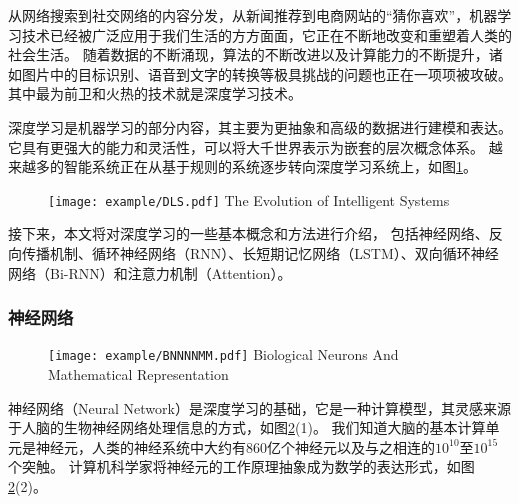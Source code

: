 从网络搜索到社交网络的内容分发，从新闻推荐到电商网站的“猜你喜欢”，机器学习技术已经被广泛应用于我们生活的方方面面，它正在不断地改变和重塑着人类的社会生活。
随着数据的不断涌现，算法的不断改进以及计算能力的不断提升，诸如图片中的目标识别、语音到文字的转换等极具挑战的问题也正在一项项被攻破。
其中最为前卫和火热的技术就是深度学习技术。

深度学习是机器学习的部分内容，其主要为更抽象和高级的数据进行建模和表达。
它具有更强大的能力和灵活性，可以将大千世界表示为嵌套的层次概念体系。
越来越多的智能系统正在从基于规则的系统逐步转向深度学习系统上，如图\ref{fig:DLS}。

\begin{figure}[!htp]
  \centering
  \texttt{[image: example/DLS.pdf]}
    {The Evolution of Intelligent Systems}
  \label{fig:DLS}
\end{figure}

接下来，本文将对深度学习的一些基本概念和方法进行介绍，
包括神经网络、反向传播机制、循环神经网络（RNN）、长短期记忆网络（LSTM）、双向循环神经网络（Bi-RNN）和注意力机制（Attention）。

\subsubsection{神经网络}

\begin{figure}[!htp]
  \centering
  \texttt{[image: example/BNNNNMM.pdf]}
    {Biological Neurons And Mathematical Representation}
  \label{fig:BNNNNMM}
\end{figure}

神经网络（Neural Network）是深度学习的基础，它是一种计算模型，其灵感来源于人脑的生物神经网络处理信息的方式，如图\ref{fig:BNNNNMM}(1)。
我们知道大脑的基本计算单元是神经元，人类的神经系统中大约有860亿个神经元以及与之相连的$10^{10}$至$10^{15}$个突触。
计算机科学家将神经元的工作原理抽象成为数学的表达形式，如图\ref{fig:BNNNNMM}(2)。

